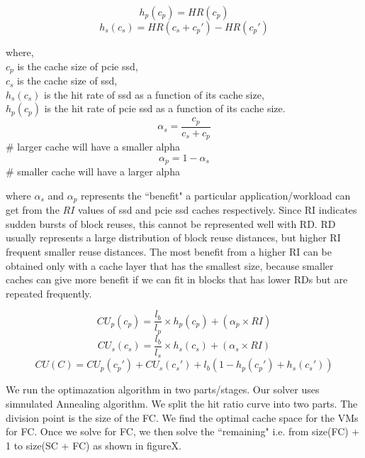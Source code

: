 $$ h_p(c_p)  = HR(c_p) $$
$$ h_s(c_s)  = HR(c_s + c_p') - HR(c_p') $$

where, \\ 
$c_p$ is the cache size of pcie ssd, \\
$c_s$ is the cache size of ssd, \\
$h_s(c_s)$ is the hit rate of ssd as a function of its cache size, \\
$h_p(c_p)$ is the hit rate of pcie ssd as a function of its cache size.  \\


$$   \alpha_s = \frac{c_p}{c_s + c_p} $$ \# larger cache will have a smaller alpha
$$   \alpha_p = 1-\alpha_s $$ \# smaller cache will have a larger alpha

where $\alpha_s$ and $\alpha_p$ represents the ``benefit" a particular application/workload can get from the $RI$ values of ssd and pcie ssd caches respectively. Since RI indicates sudden bursts of block reuses, this cannot be represented well with RD. RD usually represents a large distribution of block reuse distances, but higher RI frequent smaller reuse distances. The most benefit from a higher RI can be obtained only with a cache layer that has the smallest size, because smaller caches can give more benefit if we can fit in blocks that has lower RDs but are repeated frequently.



$$ CU_p(c_p) = \frac{l_b}{l_p} \times h_p(c_p) + (\alpha_p \times RI) $$
$$ CU_s(c_s) = \frac{l_b}{l_s} \times h_s(c_s) + (\alpha_s \times RI) $$
$$ CU(C) = CU_p(c_p') + CU_s(c_s') + l_b (1 - h_p(c_p') + h_s(c_s')) $$ 

We run the optimazation algorithm in two parts/stages. Our solver uses simnulated Annealing algorithm. We split the hit ratio curve into two parts. The division point is the size of the FC. We find the optimal cache space for the VMs for FC. Once we solve for FC, we then solve the ``remaining" i.e. from size(FC) + 1 to size(SC + FC) as shown in figureX.
